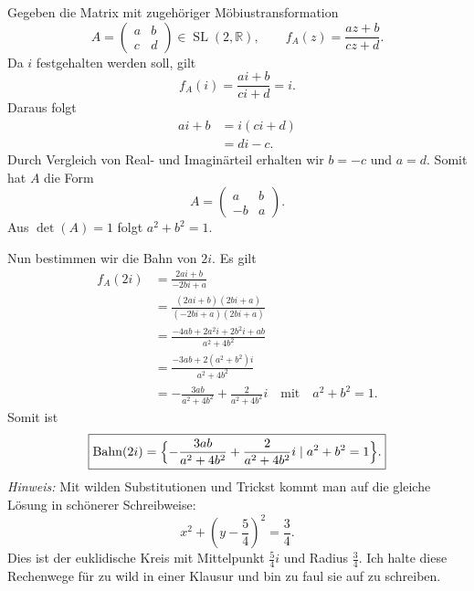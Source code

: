 Gegeben die Matrix mit zugehöriger Möbiustransformation
\[
    A=
    \begin{pmatrix}
        a & b\\
        c & d
    \end{pmatrix}
    \in \operatorname{SL}(2,\mathbb R), \qquad
    f_A(z)=\frac{az+b}{cz+d}.
\]
Da \(i\) festgehalten werden soll, gilt
\[
    f_A(i)
    =
    \frac{ai+b}{ci+d}
    =
    i.
\]
Daraus folgt
\begin{align*}
    ai+b
    &=i(ci+d)\\
    &=di-c.
\end{align*}
Durch Vergleich von Real- und Imaginärteil erhalten wir
\(b=-c\) und \(a=d\).
Somit hat \(A\) die Form
\[
    A=
    \begin{pmatrix}
        a & b\\
        -b & a
    \end{pmatrix}.
\]
Aus \(\det(A)=1\) folgt \(a^2+b^2=1\).

Nun bestimmen wir die Bahn von \(2i\). Es gilt
\begin{align*}
    f_A(2i)
    &=
    \frac{2ai+b}{-2bi+a}\\
    &=
    \frac{(2ai+b)(2bi+a)}
         {(-2bi+a)(2bi+a)}\\
    &=
    \frac{-4ab+2a^2i+2b^2i+ab}
         {a^2+4b^2}\\
    &=
    \frac{-3ab+2(a^2+b^2)i}
         {a^2+4b^2}\\
    &=
    -\frac{3ab}{a^2+4b^2}
    +
    \frac{2}{a^2+4b^2}i \quad \text{mit} \quad a^2+b^2=1.
\end{align*}
Somit ist
\[
    \boxed{\operatorname{Bahn}(2i) = \Bigl\{
        -\frac{3ab}{a^2+4b^2}
        +
        \frac{2}{a^2+4b^2}i \mid a^2+b^2=1\Bigr\}.}
\]
\textit{Hinweis:} Mit wilden Substitutionen und Trickst kommt man auf die gleiche Lösung
in schönerer Schreibweise:
\[
    x^2+(y-\frac{5}{4})^2 = \frac{3}{4}.
\]
Dies ist der euklidische Kreis mit Mittelpunkt $\frac{5}{4}i$ und Radius $\frac{3}{4}$.
Ich halte diese Rechenwege für zu wild in einer Klausur und bin zu faul sie auf zu schreiben.